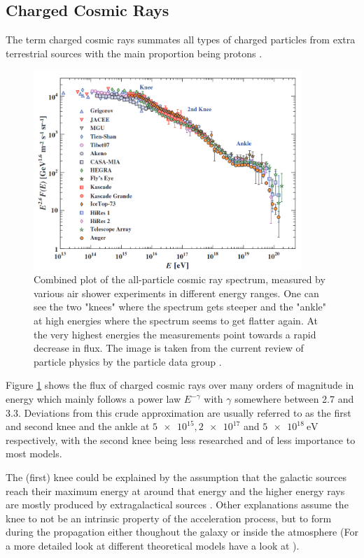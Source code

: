 \subsection{Charged Cosmic Rays}
The term charged cosmic rays summates all types of charged particles from
extra terrestrial sources with the main proportion being protons
\cite{Dembinski:2017zsh}.


\begin{figure}
	\centering
	\captionsetup{width=0.9\linewidth}
	\includegraphics[width=0.9\textwidth]{images/cr_spectrum.png}
	\caption{Combined plot of the all-particle cosmic ray spectrum,
		measured by various air shower experiments in different
		energy ranges. One can see the two "knees" where
		the spectrum gets steeper and the "ankle" at high
		energies where the spectrum seems to get flatter again.
		At the very highest energies the measurements point towards
		a rapid decrease in flux.
		The image is taken from the current review of particle physics
		by the particle data group \cite{pdg19}.
	}
	\label{fig:cr_spectrum}
\end{figure}

Figure \ref{fig:cr_spectrum} shows the flux of charged cosmic rays over 
many orders of magnitude in energy which mainly follows 
a power law $E^{-\gamma}$ with $\gamma$ somewhere between 
2.7 and 3.3. Deviations from this crude approximation are 
usually referred to as the first and second knee and the ankle 
at $\num{5e15}, \num{2e17}$ and $\SI{5e18}{\electronvolt}$ respectively,
with the second knee being less researched and of less importance
to most models.

The (first) knee could be explained by the assumption that the galactic sources
reach their maximum energy at around that energy and the higher energy rays
are mostly produced by extragalactical sources \cite{pdg19}.
Other explanations assume the knee to not be an intrinsic property of the acceleration process,
but to form during the propagation either thoughout the galaxy or
inside the atmosphere (For a more detailed look at different 
theoretical models have a look
at \cite{HORANDEL2004241}).

